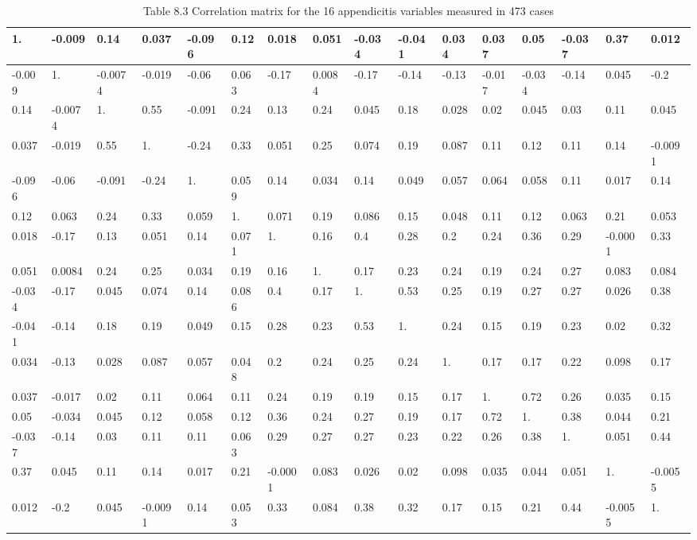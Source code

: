 \documentclass[10pt]{article}
\begin{document}
\begin{table}[h]
\begin{center}
\captionsetup{labelformat=empty}
\caption{Table 8.3 Correlation matrix for the 16 appendicitis variables measured in 473 cases}
\begin{tabular}{|l|l|l|l|l|l|l|l|l|l|l|l|l|l|l|l|}
\hline
1. & -0.009 & 0.14 & 0.037 & -0.096 & 0.12 & 0.018 & 0.051 & -0.034 & -0.041 & 0.034 & 0.037 & 0.05 & -0.037 & 0.37 & 0.012 \\
\hline
-0.009 & 1. & -0.0074 & -0.019 & -0.06 & 0.063 & -0.17 & 0.0084 & -0.17 & -0.14 & -0.13 & -0.017 & -0.034 & -0.14 & 0.045 & -0.2 \\
\hline
0.14 & -0.0074 & 1. & 0.55 & -0.091 & 0.24 & 0.13 & 0.24 & 0.045 & 0.18 & 0.028 & 0.02 & 0.045 & 0.03 & 0.11 & 0.045 \\
\hline
0.037 & -0.019 & 0.55 & 1. & -0.24 & 0.33 & 0.051 & 0.25 & 0.074 & 0.19 & 0.087 & 0.11 & 0.12 & 0.11 & 0.14 & -0.0091 \\
\hline
-0.096 & -0.06 & -0.091 & -0.24 & 1. & 0.059 & 0.14 & 0.034 & 0.14 & 0.049 & 0.057 & 0.064 & 0.058 & 0.11 & 0.017 & 0.14 \\
\hline
0.12 & 0.063 & 0.24 & 0.33 & 0.059 & 1. & 0.071 & 0.19 & 0.086 & 0.15 & 0.048 & 0.11 & 0.12 & 0.063 & 0.21 & 0.053 \\
\hline
0.018 & -0.17 & 0.13 & 0.051 & 0.14 & 0.071 & 1. & 0.16 & 0.4 & 0.28 & 0.2 & 0.24 & 0.36 & 0.29 & -0.0001 & 0.33 \\
\hline
0.051 & 0.0084 & 0.24 & 0.25 & 0.034 & 0.19 & 0.16 & 1. & 0.17 & 0.23 & 0.24 & 0.19 & 0.24 & 0.27 & 0.083 & 0.084 \\
\hline
-0.034 & -0.17 & 0.045 & 0.074 & 0.14 & 0.086 & 0.4 & 0.17 & 1. & 0.53 & 0.25 & 0.19 & 0.27 & 0.27 & 0.026 & 0.38 \\
\hline
-0.041 & -0.14 & 0.18 & 0.19 & 0.049 & 0.15 & 0.28 & 0.23 & 0.53 & 1. & 0.24 & 0.15 & 0.19 & 0.23 & 0.02 & 0.32 \\
\hline
0.034 & -0.13 & 0.028 & 0.087 & 0.057 & 0.048 & 0.2 & 0.24 & 0.25 & 0.24 & 1. & 0.17 & 0.17 & 0.22 & 0.098 & 0.17 \\
\hline
0.037 & -0.017 & 0.02 & 0.11 & 0.064 & 0.11 & 0.24 & 0.19 & 0.19 & 0.15 & 0.17 & 1. & 0.72 & 0.26 & 0.035 & 0.15 \\
\hline
0.05 & -0.034 & 0.045 & 0.12 & 0.058 & 0.12 & 0.36 & 0.24 & 0.27 & 0.19 & 0.17 & 0.72 & 1. & 0.38 & 0.044 & 0.21 \\
\hline
-0.037 & -0.14 & 0.03 & 0.11 & 0.11 & 0.063 & 0.29 & 0.27 & 0.27 & 0.23 & 0.22 & 0.26 & 0.38 & 1. & 0.051 & 0.44 \\
\hline
0.37 & 0.045 & 0.11 & 0.14 & 0.017 & 0.21 & -0.0001 & 0.083 & 0.026 & 0.02 & 0.098 & 0.035 & 0.044 & 0.051 & 1. & -0.0055 \\
\hline
0.012 & -0.2 & 0.045 & -0.0091 & 0.14 & 0.053 & 0.33 & 0.084 & 0.38 & 0.32 & 0.17 & 0.15 & 0.21 & 0.44 & -0.0055 & 1. \\
\hline
\end{tabular}
\end{center}
\end{table}
\end{document}

